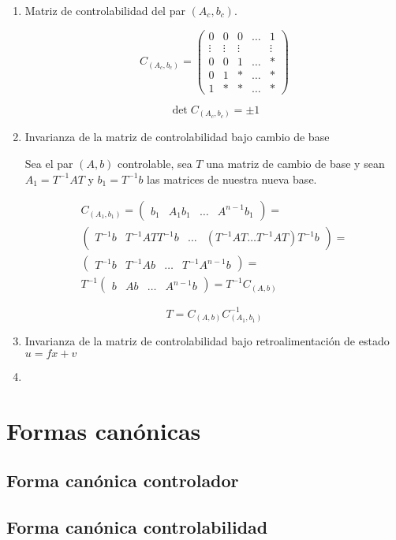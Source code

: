\begin{enumerate}
\item Matriz de controlabilidad del par $(A_c, b_c)$.

\begin{equation}
C_{(A_c,b_c)} =
\begin{pmatrix}
0 & 0 & 0 & \dots & 1 \\
\vdots & \vdots & \vdots & & \vdots \\
0 & 0 & 1 & \dots & * \\
0 & 1 & * & \dots & * \\
1 & * & * & \dots & *
\end{pmatrix}
\end{equation}

\begin{equation}
\det{C_{(A_c, b_c)}} = \pm 1
\end{equation}

\item Invarianza de la matriz de controlabilidad bajo cambio de base

Sea el par $(A, b)$ controlable, sea $T$ una matriz de cambio de base y sean $A_1 = T^{-1} A T$ y $b_1 = T^{-1} b$ las matrices de nuestra nueva base.

\begin{multline}
C_{(A_1, b_1)} =
\begin{pmatrix}
b_1 & A_1 b_1 & \dots & A^{n-1} b_1
\end{pmatrix} = \\
\begin{pmatrix}
T^{-1} b & T^{-1} A T T^{-1} b & \dots & (T^{-1} A T \dots T^{-1} A T) T^{-1} b
\end{pmatrix} = \\
\begin{pmatrix}
T^{-1} b & T^{-1} A b & \dots & T^{-1} A^{n-1} b
\end{pmatrix} = \\
T^{-1}
\begin{pmatrix}
b & A b & \dots & A^{n-1} b
\end{pmatrix} =
T^{-1} C_{(A, b)} \nonumber
\end{multline}

\begin{equation}
T = C_{(A, b)} C_{(A_1, b_1)}^{-1}
\end{equation}

\item Invarianza de la matriz de controlabilidad bajo retroalimentación de estado $u = f x + v$



\item
\end{enumerate}

\section{Formas canónicas}
\subsection{Forma canónica controlador}
\subsection{Forma canónica controlabilidad}
